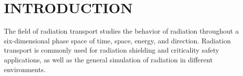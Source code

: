 %
%
%
%



\pagestyle{plain} %
\setcounter{page}{1}


\chapter{\uppercase {Introduction}}\label{cha:introduction}

The field of radiation transport studies the behavior of radiation throughout a six-dimensional phase space of time, space, energy, and direction. 
Radiation transport is commonly used for radiation shielding and criticality safety applications, as well as the general simulation of radiation in different environments. 

